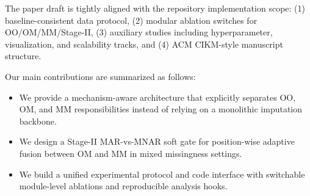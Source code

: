 The paper draft is tightly aligned with the repository implementation scope: (1) baseline-consistent data protocol, (2) modular ablation switches for OO/OM/MM/Stage-II, (3) auxiliary studies including hyperparameter, visualization, and scalability tracks, and (4) ACM CIKM-style manuscript structure.

Our main contributions are summarized as follows:
\begin{itemize}
\item We provide a mechanism-aware architecture that explicitly separates OO, OM, and MM responsibilities instead of relying on a monolithic imputation backbone.
\item We design a Stage-II MAR-vs-MNAR soft gate for position-wise adaptive fusion between OM and MM in mixed missingness settings.
\item We build a unified experimental protocol and code interface with switchable module-level ablations and reproducible analysis hooks.
\end{itemize}
